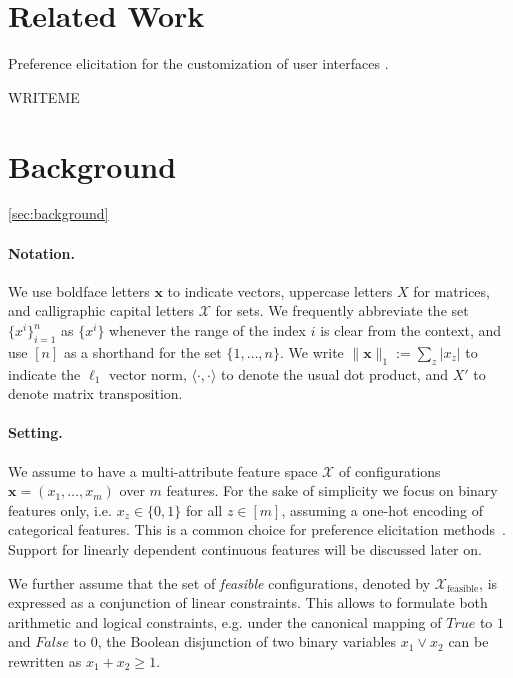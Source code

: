\documentclass{article}
\renewcommand\[{\begin{equation}}
\renewcommand\]{\end{equation}}
\newcommand{\calvar}[1]{\ensuremath{\mathcal{#1}}}
\newcommand{\calX}{\calvar{X}}
\newcommand{\vecvar}[1]{\ensuremath{\boldsymbol{#1}}}
\newcommand{\vx}{\vecvar{x}}
\begin{document}
\section{Related Work}

Preference elicitation for the customization of user interfaces \cite{gajos2005}.

WRITEME

\section{Background}
\ref{sec:background}

\paragraph{Notation.} We use boldface letters $\vx$ to indicate vectors,
uppercase letters $X$ for matrices, and calligraphic capital letters $\calX$
for sets. We frequently abbreviate the set $\{ x^i \}_{i=1}^n$ as $\{ x^i \}$
whenever the range of the index $i$ is clear from the context, and use $[n]$ as
a shorthand for the set $\{1, \ldots, n\}$. We write $\|\vx\|_1 := \sum_z |x_z|$
to indicate the $\ell_1$ vector norm, $\langle \cdot, \cdot \rangle$ to
denote the usual dot product, and $X'$ to denote matrix transposition.

\paragraph{Setting.} We assume to have a multi-attribute feature space
$\calX$ of configurations $\vx = (x_1, \ldots, x_m)$ over $m$
features. For the sake of simplicity we focus on binary features only,
i.e. $x_z\in\{0,1\}$ for all $z\in[m]$, assuming a one-hot encoding of
categorical features. This is a common choice for preference
elicitation methods~\cite{guo2010real,viappiani2010optimal}. Support
for linearly dependent continuous features will be discussed later on.

We further assume that the set of {\em feasible} configurations, denoted by
$\calX_\text{feasible}$, is expressed as
a conjunction of linear constraints. This allows to formulate both arithmetic
and logical constraints,
e.g. under the canonical mapping of $True$ to $1$ and $False$ to $0$, the
Boolean disjunction of two binary variables $x_1 \lor x_2$ can be rewritten as
$x_1 + x_2 \ge 1$.
\end{document}
